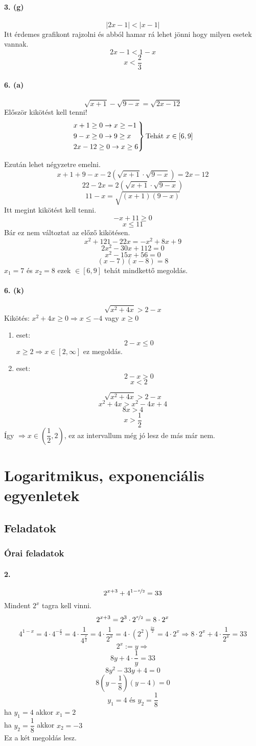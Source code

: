 \documentclass[12pt,a4paper,fleqn]{article}
\newcommand{\myparagraph}[1]{\paragraph{#1}\mbox{}}
\begin{document}
\myparagraph{3. (g)}
\[ |2x-1| < |x-1| \]
Itt érdemes grafikont rajzolni és abból hamar rá lehet jönni hogy milyen esetek vannak.
\[ 2x-1 < 1-x \]
\[ x < \dfrac{2}{3} \]


\myparagraph{6. (a)}
\[ \sqrt{x+1} - \sqrt{9-x} = \sqrt{2x-12} \]
Először kikötést kell tenni!
\[
\begin{rcases*}
  x+1 \geq 0 \rightarrow x \geq -1 \\
  9-x \geq 0 \rightarrow 9 \geq x \\
  2x-12 \geq 0 \rightarrow x \geq 6
\end{rcases*} \text{Tehát } x \in [6, 9]
\]

Ezután lehet négyzetre emelni.
\[ x+1+9-x-2(\sqrt{x+1} \cdot \sqrt{9-x}) = 2x-12 \]
\[ 22-2x = 2(\sqrt{x+1} \cdot \sqrt{9-x}) \]
\[ 11-x = \sqrt{(x+1)(9-x)} \]
Itt megint kikötést kell tenni.
\[ -x + 11 \geq 0 \]
\[ x \leq 11 \]
Bár ez nem változtat az előző kikötésen.
\[ x^2 + 121 - 22x = -x^2 + 8x + 9 \]
\[ 2x^2 -30x +112 = 0 \]
\[ x^2 -15x +56 = 0 \]
\[ (x-7)(x-8) = 8 \]
$ x_1 = 7 $ és $ x_2=8 $ ezek $\in [6,9]$ tehát mindkettő megoldás.


\myparagraph{6. (k)}
\[ \sqrt{x^2+4x} > 2-x \]
Kikötés: $ x^2 +4x \geq 0 \Rightarrow x \leq -4$ vagy $x \geq 0$
\begin{enumerate}
  \item eset:
    \[ 2-x \leq 0 \]
    $x \geq 2 \Rightarrow x \in [2, \infty]$ ez megoldás.
  \item eset:
    \[ 2-x > 0 \]
    \[ x < 2 \]
\end{enumerate}
\[ \sqrt{x^2+4x} > 2-x \]
\[ x^2 + 4x > x^2 - 4x +4 \]
\[ 8x > 4 \]
\[ x > \dfrac{1}{2} \]
Így $ \Rightarrow x \in \left(\dfrac{1}{2}, 2\right)$, ez az intervallum még jó
lesz de más már nem.


\section{Logaritmikus, exponenciális egyenletek}
\setcounter{subsection}{1}
\subsection{Feladatok}
\subsubsection{Órai feladatok}


\myparagraph{2.}
\[ 2^{x+3} + 4^{1-\nicefrac{x}{2}} = 33 \]
Mindent $2^x$ tagra kell vinni.
\[ 2^{x+3} = 2^3 \cdot 2^{\nicefrac{x}{2}} = 8 \cdot 2^x \]
\[ 4^{1-x} = 4 \cdot 4^{-\frac{x}{2}} = 4 \cdot \dfrac{1}{4^{\frac{x}{2}}} =
  4 \cdot \dfrac{1}{2^x} = 4 \cdot (2^2)^{\frac{2x}{2}} = 4 \cdot 2^x
    \Rightarrow 8 \cdot 2^x + 4 \cdot \dfrac{1}{2^x} = 33
\]
\[ 2^x := y \Rightarrow \]
\[ 8y + 4 \cdot \dfrac{1}{y} = 33 \]
\[ 8y^2 - 33y + 4 = 0 \]
\[ 8(y-\dfrac{1}{8})(y-4) =0 \]
\[ y_1 = 4 \text{ és } y_2 = \dfrac{1}{8} \]
ha $y_1 = 4$ akkor $x_1 = 2$ \\
ha $y_2 = \dfrac{1}{8}$ akkor $x_2 = -3$ \\
Ez a két megoldás lesz.
\end{document}
